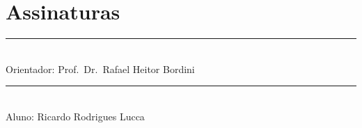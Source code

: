 \chapter*{Assinaturas}

	\vspace{3cm}

   \begin{center}
        \rule{8cm}{.1mm} \\ Orientador: Prof.~Dr.~Rafael Heitor Bordini
    \end{center}

	\vspace{3cm}

   \begin{center}
        \rule{8cm}{.1mm} \\ Aluno: Ricardo Rodrigues Lucca
    \end{center}

